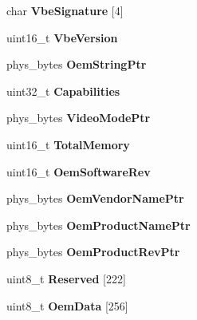 \begin{DoxyCompactItemize}
\item 
\hypertarget{group__vbe_gafd3a8744ce19caa07755c2604cce884c}{}char {\bfseries Vbe\+Signature} \mbox{[}4\mbox{]}\label{group__vbe_gafd3a8744ce19caa07755c2604cce884c}

\item 
\hypertarget{group__vbe_ga7b9fef89774326b46f9481cbd9a397d3}{}uint16\+\_\+t {\bfseries Vbe\+Version}\label{group__vbe_ga7b9fef89774326b46f9481cbd9a397d3}

\item 
\hypertarget{group__vbe_ga20ab55e9dda8d437875255529c1cffe8}{}phys\+\_\+bytes {\bfseries Oem\+String\+Ptr}\label{group__vbe_ga20ab55e9dda8d437875255529c1cffe8}

\item 
\hypertarget{group__vbe_gaf005ca0116fa8ac69ef6198824f4d659}{}uint32\+\_\+t {\bfseries Capabilities}\label{group__vbe_gaf005ca0116fa8ac69ef6198824f4d659}

\item 
\hypertarget{group__vbe_ga9d989fdbcdad6a40c10fc28c0f9af760}{}phys\+\_\+bytes {\bfseries Video\+Mode\+Ptr}\label{group__vbe_ga9d989fdbcdad6a40c10fc28c0f9af760}

\item 
\hypertarget{group__vbe_ga3e7b41e709394a10b3667e7f27f1aa7a}{}uint16\+\_\+t {\bfseries Total\+Memory}\label{group__vbe_ga3e7b41e709394a10b3667e7f27f1aa7a}

\item 
\hypertarget{group__vbe_ga133984a56ec19abf4fcb2e6ae71d6498}{}uint16\+\_\+t {\bfseries Oem\+Software\+Rev}\label{group__vbe_ga133984a56ec19abf4fcb2e6ae71d6498}

\item 
\hypertarget{group__vbe_gaffd3a330afde841405f89bbcd05af4f0}{}phys\+\_\+bytes {\bfseries Oem\+Vendor\+Name\+Ptr}\label{group__vbe_gaffd3a330afde841405f89bbcd05af4f0}

\item 
\hypertarget{group__vbe_gafd3d28c2078a683b1ed64ea21905fcfe}{}phys\+\_\+bytes {\bfseries Oem\+Product\+Name\+Ptr}\label{group__vbe_gafd3d28c2078a683b1ed64ea21905fcfe}

\item 
\hypertarget{group__vbe_ga239cba41d0489da5b79556b45797c6b0}{}phys\+\_\+bytes {\bfseries Oem\+Product\+Rev\+Ptr}\label{group__vbe_ga239cba41d0489da5b79556b45797c6b0}

\item 
\hypertarget{group__vbe_ga2c3b1cbb6bad5c51d4be4e57255a61d2}{}uint8\+\_\+t {\bfseries Reserved} \mbox{[}222\mbox{]}\label{group__vbe_ga2c3b1cbb6bad5c51d4be4e57255a61d2}

\item 
\hypertarget{group__vbe_ga966ae75c33c2d65b4f0c916f093acac0}{}uint8\+\_\+t {\bfseries Oem\+Data} \mbox{[}256\mbox{]}\label{group__vbe_ga966ae75c33c2d65b4f0c916f093acac0}

\end{DoxyCompactItemize}


